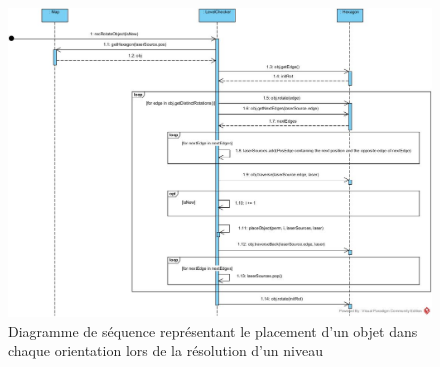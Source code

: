\documentclass[]{article}
\begin{document}
\begin{figure}[H]
\begin{center}
  \includegraphics[width=\textwidth]{Sequence4.jpg}
  \caption{Diagramme de séquence représentant le placement d'un objet dans chaque orientation lors de la résolution d'un niveau}\label{fig:auto}
\end{center}
\end{figure}
\end{document}
